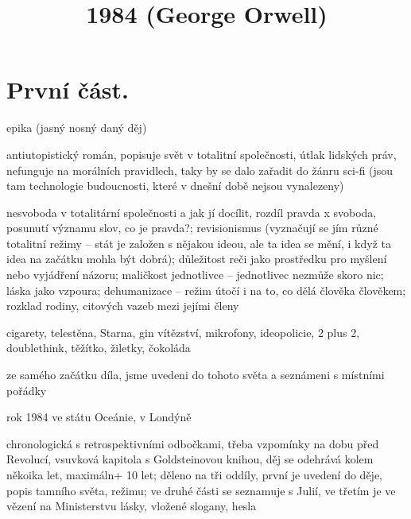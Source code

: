 \documentclass{article}
\title{\vspace{-2cm}1984 (George Orwell)\vspace{-2cm}}
\date{}
\author{}
\begin{document}
\maketitle
\section{První část.}
\begin{description}
    \setlength\itemsep{0.15em}
    \item[druh:] epika (jasný nosný daný děj)
    \item[žánr:] antiutopistický román, popisuje svět v totalitní společnosti, útlak lidských práv, nefunguje na morálních pravidlech, taky by se dalo zařadit do žánru sci-fi (jsou tam technologie budoucnosti, které v dnešní době nejsou vynalezeny)
    \item[téma:] nesvoboda v totalitární společnosti a jak jí docílit, rozdíl pravda x svoboda, posunutí významu slov, co je pravda?; revisionismus (vyznačují se jím různé totalitní režimy -- stát je založen s nějakou ideou, ale ta idea se mění, i když ta idea na začátku mohla být dobrá); důležitost reči jako prostředku pro myšlení nebo vyjádření názoru; maličkost jednotlivce -- jednotlivec nezmůže skoro nic; láska jako vzpoura; dehumanizace -- režim útočí i na to, co dělá člověka člověkem; rozklad rodiny, citových vazeb mezi jejími členy
    \item[motivy:] cigarety, telestěna, Starna, gin vítězství, mikrofony, ideopolicie, 2 plus 2, doublethink, těžítko, žiletky, čokoláda
    \item[zařazení výňatku do kontextu díla:] ze samého začátku díla, jsme uvedeni do tohoto světa a seznámeni s místními pořádky
    \item[časoprostor:] rok 1984 ve státu Oceánie, v Londýně
    \item[kompoziční výstavba:] chronologická s retrospektivními odbočkami, třeba vzpomínky na dobu před Revolucí, vsuvková kapitola s Goldsteinovou knihou, děj se odehrává kolem někoika let, maximáln+ 10 let; děleno na tři oddíly, první je uvedení do děje, popis tamního světa, režimu; ve druhé části se seznamuje s Julií, ve třetím je ve vězení na Ministerstvu lásky, vložené slogany, hesla
\end{description}
\end{document}
